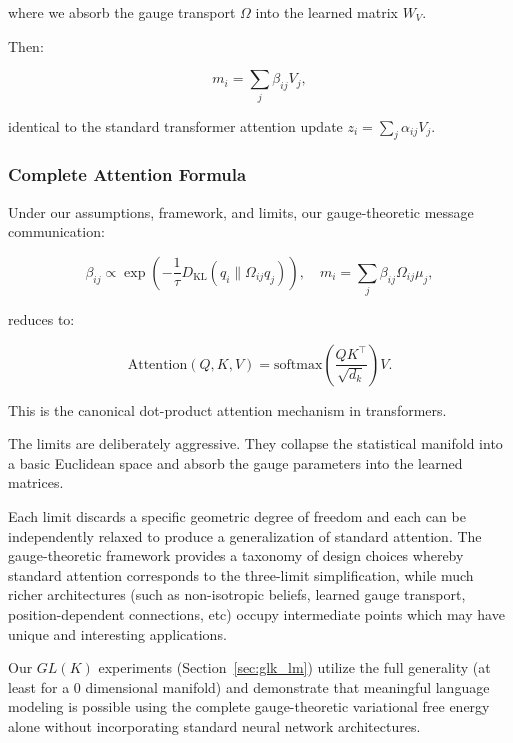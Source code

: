 \documentclass[twoside,11pt]{article}
\begin{document}
where we absorb the gauge transport $\Omega$ into the learned matrix $W_V$.

Then:

\begin{equation}
\boxed{m_i = \sum_j \beta_{ij} V_j},
\end{equation}

identical to the standard transformer attention update $z_i = \sum_j \alpha_{ij} V_j$.

\subsubsection{Complete Attention Formula}

Under our assumptions, framework, and limits, our gauge-theoretic message communication:

\begin{equation}
\beta_{ij} \propto \exp\left(-\frac{1}{\tau}D_{\mathrm{KL}}(q_i \| \Omega_{ij} q_j)\right), \quad m_i = \sum_j \beta_{ij} \Omega_{ij}\mu_j,
\end{equation}

reduces to:

\begin{equation}
\boxed{\mathrm{Attention}(Q,K,V) = \mathrm{softmax}\left(\frac{QK^\top}{\sqrt{d_k}}\right)V}.
\end{equation}

This is the canonical dot-product attention mechanism in transformers.

The limits are deliberately aggressive.  They collapse the statistical manifold into a basic Euclidean space and absorb the gauge parameters into the learned matrices. 

Each limit discards a specific geometric degree of freedom and each can be independently relaxed to produce a generalization of standard attention. The gauge-theoretic framework provides a taxonomy of design choices whereby standard attention corresponds to the three-limit simplification, while much richer architectures (such as non-isotropic beliefs, learned gauge transport, position-dependent connections, etc) occupy intermediate points which may have unique and interesting applications. 

Our $GL(K)$ experiments (Section~\ref{sec:glk_lm}) utilize the full generality (at least for a $0$ dimensional manifold) and demonstrate that meaningful language modeling is possible using the complete gauge-theoretic variational free energy alone without incorporating standard neural network architectures.
\end{document}
